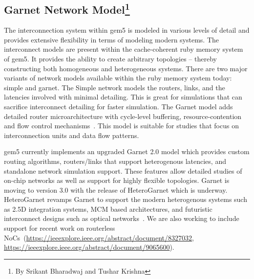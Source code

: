\subsection[Garnet Network Model]{Garnet Network Model\footnote{By Srikant Bharadwaj and Tushar Krishna}}

The interconnection system within gem5 is modeled in various levels of detail and provides extensive
flexibility in terms of modeling modern systems.
The interconnect models are present within the cache-coherent ruby memory system of gem5.
It provides the ability to create arbitrary topologies – thereby constructing both homogeneous and heterogeneous systems.
There are two major variants of network models available within the ruby memory system today: simple and garnet.
The Simple network models the routers, links, and the latencies involved with minimal detailing.
This is great for simulations that can sacrifice interconnect detailing for faster simulation.
The Garnet model adds detailed router microarchitecture with cycle-level buffering, resource-contention and flow control mechanisms~\cite{garnet-2}.
This model is suitable for studies that focus on interconnection units and data flow patterns.

gem5 currently implements an upgraded Garnet 2.0 model which provides custom routing algorithms, routers/links that support heterogenous latencies, and standalone network simulation support.
These features allow detailed studies of on-chip networks as well as support for highly flexible topologies.
Garnet is moving to version 3.0 with the release of HeteroGarnet which is underway.
HeteroGarnet revamps Garnet to support the modern heterogenous systems such as 2.5D integration systems, MCM based architectures, and futuristic interconnect designs such as optical networks~\cite{kite}.
We are also working to include support for recent work on routerless NoCs~\cite{}(\url{https://ieeexplore.ieee.org/abstract/document/8327032}, \url{https://ieeexplore.ieee.org/abstract/document/9065600}).

